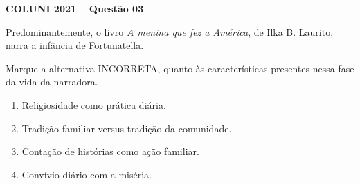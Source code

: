 \textbf{COLUNI 2021 -- Questão 03}\par\medskip Predominantemente, o livro \textit{A menina que fez a América}, de Ilka B. Laurito, narra a infância de Fortunatella.

\par

Marque a alternativa INCORRETA, quanto às características presentes nessa fase da vida da narradora.\begin{enumerate}
\item Religiosidade como prática diária.
\item Tradição familiar versus tradição da comunidade.
\item Contação de histórias como ação familiar.
\item Convívio diário com a miséria.\end{enumerate}
